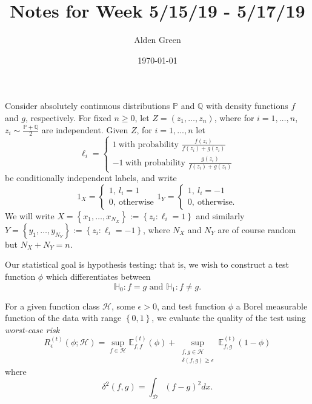 \documentclass{article}
\newcommand{\set}[1]{\left\{#1\right\}}
\newcommand{\1}{\mathbb{I}}
\newcommand{\D}{\mathcal{D}}
\newcommand{\X}{X} %
\newcommand{\Y}{Y} %
\newcommand{\Z}{Z} %
\newcommand{\Hclass}{\mathcal{H}}
\newcommand{\Pbb}{\mathbb{P}}
\newcommand{\Ebb}{\mathbb{E}}
\newcommand{\Qbb}{\mathbb{Q}}
\theoremstyle{alden}
\theoremstyle{aldenthm}
\theoremstyle{definition}
\theoremstyle{remark}
\begin{document}
\title{Notes for Week 5/15/19 - 5/17/19}
\author{Alden Green}
\date{\today}
\maketitle

Consider absolutely continuous distributions $\Pbb$ and $\Qbb$ with density functions $f$ and $g$, respectively. For fixed $n \geq 0$, let $\Z = (z_1, \ldots,z_n)$, where for $i = 1,\ldots,n$, $z_i \sim \frac{\Pbb + \Qbb}{2}$ are independent. Given $\Z$, for $i = 1,...,n$ let
\begin{equation*}
\ell_i = 
\begin{cases}
1~ \text{with probability $\frac{f(z_i)}{f(z_i) + g(z_i)}$} \\
-1~ \text{with probability $\frac{g(z_i)}{f(z_i) + g(z_i)}$}
\end{cases}
\end{equation*} 
be conditionally independent labels, and write
\begin{equation*}
1_X = 
\begin{cases}
1,~ l_i = 1\\
0,~ \text{otherwise}
\end{cases}
1_Y = 
\begin{cases}
1,~ l_i = -1 \\
0,~ \text{otherwise.}
\end{cases}
\end{equation*}
We will write $\X = \set{x_1, \ldots,x_{N_X}} := \set{z_i: \ell_i = 1}$ and similarly $\Y = \set{y_1, \ldots,y_{N_Y}} := \set{z_i: \ell_i = -1}$, where $N_X$ and $N_Y$ are of course random but $N_X + N_Y = n$. 

Our statistical goal is hypothesis testing: that is, we wish to construct a test function $\phi$ which differentiates between
\begin{equation*}
\mathbb{H}_0: f = g \text{ and } \mathbb{H}_1: f \neq g.
\end{equation*}

For a given function class $\Hclass$, some $\epsilon > 0$, and test function $\phi$ a Borel measurable function of the data with range $\set{0,1}$, we evaluate the quality of the test using \emph{worst-case risk}
\begin{equation*}
R_{\epsilon}^{(t)}(\phi; \Hclass) = \sup_{f \in \Hclass} \Ebb_{f,f}^{(t)}(\phi) + \sup_{ \substack{f,g \in \Hclass \\ \delta(f,g) \geq \epsilon } } \Ebb_{f,g}^{(t)}(1 - \phi)
\end{equation*} 
where 
\begin{equation*}
\delta^2(f,g) = \int_{\D} (f - g)^2 dx.
\end{equation*}
\end{document}
